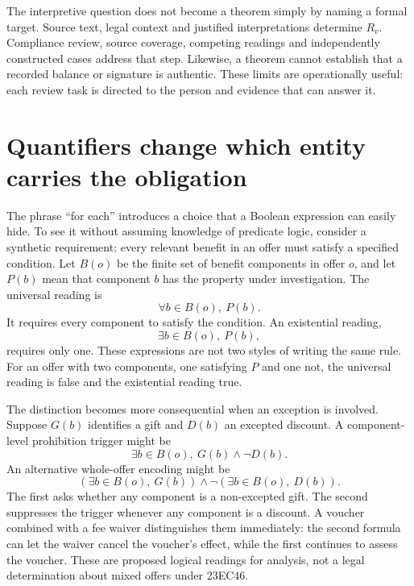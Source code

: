 The interpretive question does not become a theorem simply by naming a formal
target. Source text, legal context and justified interpretations determine
$R_v$. Compliance review, source coverage, competing readings and independently
constructed cases address that step. Likewise, a theorem cannot establish that
a recorded balance or signature is authentic. These limits are operationally
useful: each review task is directed to the person and evidence that can answer it.

\section{Quantifiers change which entity carries the obligation}
\label{merge:M03:01}


The phrase ``for each'' introduces a choice that a Boolean expression can easily
hide. To see it without assuming knowledge of predicate logic, consider a
synthetic requirement: every relevant benefit in an offer must satisfy a specified
condition. Let $B(o)$ be the finite set of benefit components in offer $o$, and
let $P(b)$ mean that component $b$ has the property under investigation. The
universal reading is
\begin{equation}
 \forall b\in B(o),\ P(b).
 \label{eq:universal-benefit}
\end{equation}
It requires every component to satisfy the condition. An existential reading,
\begin{equation}
 \exists b\in B(o),\ P(b),
 \label{eq:existential-benefit}
\end{equation}
requires only one. These expressions are not two styles of writing the same rule.
For an offer with two components, one satisfying $P$ and one not, the universal
reading is false and the existential reading true.

The distinction becomes more consequential when an exception is involved. Suppose
$G(b)$ identifies a gift and $D(b)$ an excepted discount. A component-level
prohibition trigger might be
\begin{equation}
 \exists b\in B(o),\ G(b)\land\neg D(b).
 \label{eq:component-exception}
\end{equation}
An alternative whole-offer encoding might be
\begin{equation}
 \left(\exists b\in B(o),\ G(b)\right)
 \land\neg\left(\exists b\in B(o),\ D(b)\right).
 \label{eq:offer-exception}
\end{equation}
The first asks whether any component is a non-excepted gift. The second suppresses
the trigger whenever any component is a discount. A voucher combined with a fee
waiver distinguishes them immediately: the second formula can let the waiver
cancel the voucher's effect, while the first continues to assess the voucher.
These are proposed logical readings for analysis, not a legal determination about
mixed offers under 23EC46.

